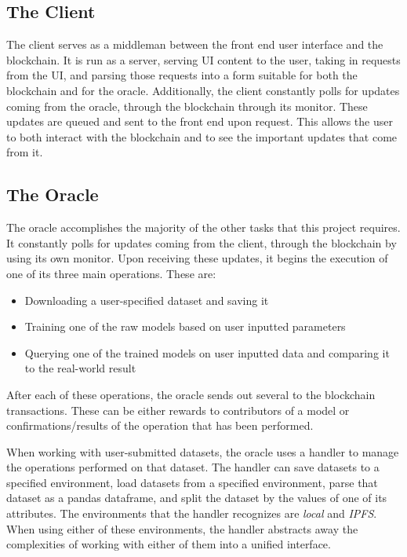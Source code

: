 \documentclass{article}
\begin{document}
    \subsection{The Client}

    The client serves as a middleman between the front end user interface and the blockchain.  It is run as a server,
    serving UI content to the user, taking in requests from the UI, and parsing those requests into a form suitable for
    both the blockchain and for the oracle.  Additionally, the client constantly polls for updates coming from the oracle,
    through the blockchain through its monitor.  These updates are queued and sent to the front end upon request. This
    allows the user to both interact with the blockchain and to see the important updates that come from it.

    \subsection{The Oracle}

    The oracle accomplishes the majority of the other tasks that this project requires.  It constantly polls for updates
    coming from the client, through the blockchain by using its own monitor.  Upon receiving these updates, it begins
    the execution of one of its three main operations.  These are:

    \begin{itemize}
        \item Downloading a user-specified dataset and saving it
        \item Training one of the raw models based on user inputted parameters
        \item Querying one of the trained models on user inputted data and comparing it to the real-world result
    \end{itemize}

    After each of these operations, the oracle sends out several to the blockchain transactions.  These can be either
    rewards to contributors of a model or confirmations/results of the operation that has been performed.

    When working with user-submitted datasets, the oracle uses a handler to manage the operations performed on that dataset.
    The handler can save datasets to a specified environment, load datasets from a specified environment, parse that dataset
    as a pandas dataframe, and split the dataset by the values of one of its attributes.  The environments that the handler
    recognizes are \textit{local} and \textit{IPFS}.  When using either of these environments, the handler abstracts away the
    complexities of working with either of them into a unified interface.
\end{document}
